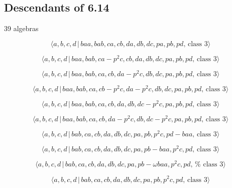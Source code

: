 \documentclass[10pt]{article}
\begin{document}
\subsection{Descendants of 6.14}

39 algebras

\begin{equation}
\langle a,b,c,d\,|\,baa,bab,ca,cb,da,db,dc,pa,pb,pd,\,\text{class }3\rangle 
\tag{7.3667}
\end{equation}

\begin{equation}
\langle a,b,c,d\,|\,baa,bab,ca-p^2c,cb,da,db,dc,pa,pb,pd,\,\text{class }%
3\rangle  \tag{7.3668}
\end{equation}

\begin{equation}
\langle a,b,c,d\,|\,baa,bab,ca,cb,da-p^2c,db,dc,pa,pb,pd,\,\text{class }%
3\rangle  \tag{7.3669}
\end{equation}

\begin{equation}
\langle a,b,c,d\,|\,baa,bab,ca,cb-p^2c,da-p^2c,db,dc,pa,pb,pd,\,\text{class }%
3\rangle  \tag{7.3670}
\end{equation}

\begin{equation}
\langle a,b,c,d\,|\,baa,bab,ca,cb,da,db,dc-p^2c,pa,pb,pd,\,\text{class }%
3\rangle  \tag{7.3671}
\end{equation}

\begin{equation}
\langle a,b,c,d\,|\,baa,bab,ca,cb,da-p^2c,db,dc-p^2c,pa,pb,pd,\,\text{class }%
3\rangle  \tag{7.3672}
\end{equation}

\begin{equation}
\langle a,b,c,d\,|\,bab,ca,cb,da,db,dc,pa,pb,p^2c,pd-baa,\,\text{class }%
3\rangle  \tag{7.3673}
\end{equation}

\begin{equation}
\langle a,b,c,d\,|\,bab,ca,cb,da,db,dc,pa,pb-baa,p^2c,pd,\,\text{class }%
3\rangle  \tag{7.3674}
\end{equation}

\begin{equation}
\langle a,b,c,d\,|\,bab,ca,cb,da,db,dc,pa,pb-\omega baa,p^{2}c,pd,\,\text{%
class }3\rangle  \tag{7.3675}
\end{equation}

\begin{equation}
\langle a,b,c,d\,|\,bab,ca,cb,da,db,dc,pa,pb,p^2c,pd,\,\text{class }3\rangle
\tag{7.3676}
\end{equation}
\end{document}
